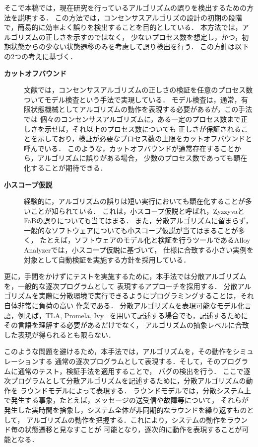 \documentclass[technicalreport]{ieicej}
\theoremstyle{plain}
\begin{document}
そこで本稿では，現在研究を行っているアルゴリズムの誤りを検出するための方法を説明する．
この方法では，コンセンサスアルゴリズの設計の初期の段階で，簡易的に効率よく誤りを検出することを目的としている．
本方法では，アルゴリズムの正しさを示すのではなく，
少ないプロセス数を想定し，かつ，初期状態からの少ない状態遷移のみを考慮して誤り検出を行う．
この方針は以下の2つの考えに基づく．
\begin{description}
\item[\textbf{カットオフバウンド}]
文献\cite{MaricSB17}では，コンセンサスアルゴリズムの正しさの検証を任意のプロセス数ついてモデル検査という手法で実現している．
モデル検査は，通常，有限状態機械としてアルゴリズムの動作を表現する必要があるが，この手法では
個々のコンセンサスアルゴリズムに，ある一定のプロセス数まで正しさを示せば，それ以上のプロセス数についても
正しさが保証されることを示しており，検証が必要なプロセス数の上限をカットオフバウンドと呼んでいる．
このような，カットオフバウンドが通常存在することから，アルゴリズムに誤りがある場合，
少数のプロセス数であっても顕在化することが期待できる．

\item[\textbf{小スコープ仮説}]
経験的に，アルゴリズムの誤りは短い実行においても顕在化することが多いことが知られている．
これは，小スコープ仮説と呼ばれ，ZyzzyvaとFaBの誤りについても当てはまる．
また，分散アルゴリズムに留まらず，一般的なソフトウェアについても小スコープ仮説が当てはまることが多く，
たとえば，ソフトウェアのモデル化と検証を行うツールであるAlloy Analyzerでは，小スコープ仮説に基づいて，
仕様に合致する小さい実例を対象として自動検証を実施する方針を採用している\cite{10.1145/3338843}．
\end{description}

更に，手間をかけずにテストを実施するために，本手法では分散アルゴリズムを，一般的な逐次プログラムとして
表現するアプローチを採用する．
分散アルゴリズムを実際に分散環境で実行できるようにプログラミングすることは，それ自体非常に負荷の高い
作業である．
分散アルゴリズムを表現可能なモデル化言語，例えば，TLA\cite{177726}, Promela\cite{spinbook}, Ivy~\cite{Ivy}
を用いて記述する場合でも，記述するためにその言語を理解する必要があるだけでなく，
アルゴリズムの抽象レベルに合致した表現が得られるとも限らない．

このような問題を避けるため，本手法では，アルゴリズムを，その動作をシミュレーションする
通常の逐次プログラムとして表現する．そして，そのプログラムに通常のテスト，検証手法を適用することで，
バグの検出を行う．
ここで逐次プログラムとして分散アルゴリズムを記述するために，分散アルゴリズムの動作を
ラウンドモデルによって表現する\cite{277724,HOjournal}．
ラウンドモデルでは，分散システム上で発生する事象，たとえば，メッセージの送受信や故障等について，
それらが発生した実時間を捨象し，システム全体が非同期的なラウンドを繰り返すものとして，
アルゴリズムの動作を把握する．これにより，システムの動作をラウンド毎の状態遷移と見なすことが
可能となり，逐次的に動作を表現することが可能となる．
\end{document}
